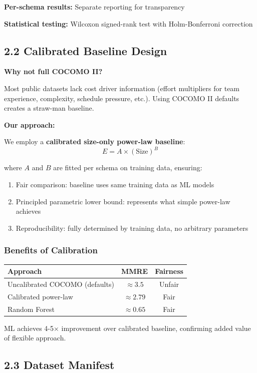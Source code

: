 \documentclass[11pt,a4paper]{article}
\begin{document}
\textbf{Per-schema results:} Separate reporting for transparency

\textbf{Statistical testing:} Wilcoxon signed-rank test with Holm-Bonferroni correction

\subsection{2.2 Calibrated Baseline Design}

\textbf{Why not full COCOMO II?}

Most public datasets lack cost driver information (effort multipliers for team experience, complexity, schedule pressure, etc.). Using COCOMO II defaults creates a straw-man baseline.

\textbf{Our approach:}

We employ a \textbf{calibrated size-only power-law baseline}:
$$E = A \times (\text{Size})^B$$

where $A$ and $B$ are fitted per schema on training data, ensuring:
\begin{enumerate}
    \item Fair comparison: baseline uses same training data as ML models
    \item Principled parametric lower bound: represents what simple power-law achieves
    \item Reproducibility: fully determined by training data, no arbitrary parameters
\end{enumerate}

\subsubsection{Benefits of Calibration}

\begin{center}
\begin{tabular}{l|c|c}
\hline
Approach & MMRE & Fairness \\
\hline
Uncalibrated COCOMO (defaults) & $\approx 3.5$ & Unfair \\
Calibrated power-law & $\approx 2.79$ & Fair \\
Random Forest & $\approx 0.65$ & Fair \\
\hline
\end{tabular}
\end{center}

ML achieves 4-5$\times$ improvement over calibrated baseline, confirming added value of flexible approach.

\subsection{2.3 Dataset Manifest}
\end{document}
